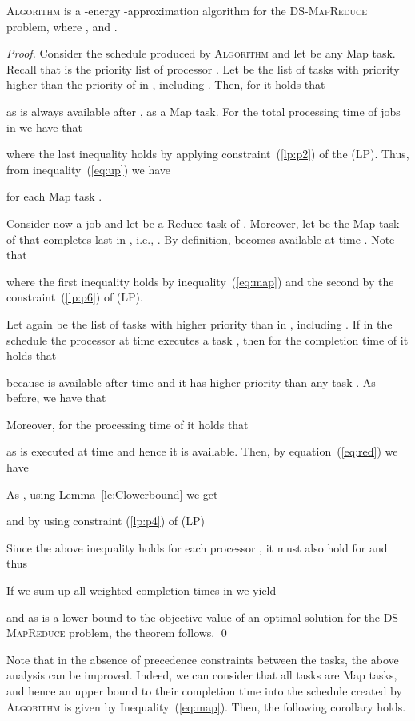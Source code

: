 \documentclass{llncs}
\newcommand{\dmr}{\textsc{DS-MapReduce}\xspace}
\newcommand{\algomr}{\textsc{Algorithm} \xspace}
\begin{document}
\begin{theorem}
\algomr is a -energy -approximation algorithm for the \dmr problem,
where ,  and .
\label{thm:main}
\end{theorem}
\begin{proof}
Consider the schedule  produced by \algomr and let  be any Map task.
Recall that  is the priority list of processor .
Let  be the list of tasks with priority higher than the priority of  in , including .
Then, for  it holds that

as  is always available after , as a Map task.
For the total processing time of jobs in  we have that

where the last inequality holds by applying constraint~(\ref{lp:p2}) of the (LP).
Thus, from inequality~(\ref{eq:up}) we have

for each Map task .

Consider now a job  and let  be a Reduce task of .
Moreover, let  be the Map task of  that completes last in ,
i.e., .
By definition,  becomes available at time .
Note that

where the first inequality holds by inequality~(\ref{eq:map}) and the second by the constraint~(\ref{lp:p6}) of (LP).

Let again  be the list of tasks with higher priority than  in , including .
If in the schedule  the processor  at time  executes a task ,
then for the completion time of  it holds that

because  is available after time  and it has higher priority than any task .
As before, we have that

Moreover, for the processing time of  it holds that

as  is executed at time  and hence it is available.
Then, by equation~(\ref{eq:red}) we have


As , using Lemma~\ref{le:Clowerbound} we get

and by using constraint (\ref{lp:p4}) of (LP)

Since the above inequality holds for each processor ,
it must also hold for  and thus

If we sum up all weighted completion times in  we yield

and as  is a lower bound to the objective value of an optimal solution
for the \dmr problem, the theorem follows. \qed
\end{proof}

Note that in the absence of precedence constraints between the tasks, the above analysis can be improved.
Indeed, we can consider that all tasks are Map tasks,
and hence an upper bound to their completion time into the schedule created by \algomr is given by Inequality~(\ref{eq:map}).
Then, the following corollary holds.
\end{document}
